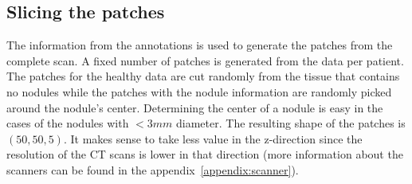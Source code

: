 \documentclass[../Thesis.tex]{subfiles}
\begin{document}
\subsection{Slicing the patches}
The information from the annotations is used to generate the patches from the complete scan. A fixed number of patches is generated from the data per patient. The patches for the healthy data are cut randomly from the tissue that contains no nodules while the patches with the nodule information are randomly picked around the nodule's center. Determining the center of a nodule is easy in the cases of the nodules with $<3mm$ diameter. The resulting shape of the patches is $(50,50,5)$. It makes sense to take less value in the z-direction since the resolution of the CT scans is lower in that direction (more information about the scanners can be found in the appendix~\ref{appendix:scanner}).
\end{document}
